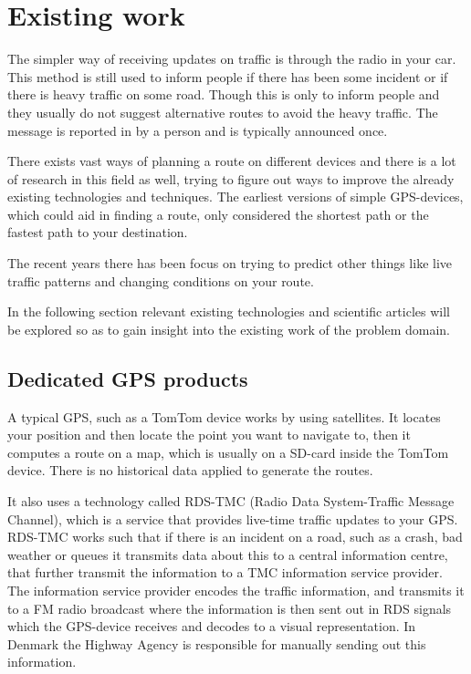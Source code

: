 \section{Existing work}
The simpler way of receiving updates on traffic is through the radio in your car. This method is still used to inform people if there has been some incident or if there is heavy traffic on some road. Though this is only to inform people and they usually do not suggest alternative routes to avoid the heavy traffic. The message is reported in by a person and is typically announced once. 

There exists vast ways of planning a route on different devices and there is  a lot of research in this field as well, trying to figure out ways to improve the already existing technologies and techniques. The earliest versions of simple GPS-devices, which could aid in finding a route, only considered the shortest path or the fastest path to your destination.

The recent years there has been focus on trying to predict other things like live traffic patterns and changing conditions on your route.

In the following section relevant existing technologies and scientific articles will be explored so as to gain insight into the existing work of the problem domain.

\subsection*{Dedicated GPS products}
A typical GPS, such as a TomTom device works by using satellites. It locates your position and then locate the point you want to navigate to, then it computes a route on a map, which is usually on a SD-card inside the TomTom device. There is no historical data applied to generate the routes.

It also uses a technology called RDS-TMC (Radio Data System-Traffic Message Channel), which is a service that provides live-time traffic updates to your GPS. RDS-TMC works such that if there is an incident on a road, such as a crash, bad weather or queues it transmits data about this to a central information centre, that further transmit the information to a TMC information service provider. The information service provider encodes the traffic information, and transmits it to a FM radio broadcast where the information is then sent out in RDS signals which the GPS-device receives and decodes to a visual representation. In Denmark the Highway Agency is responsible for manually sending out this information\cite{Vejdirektorat}. 

